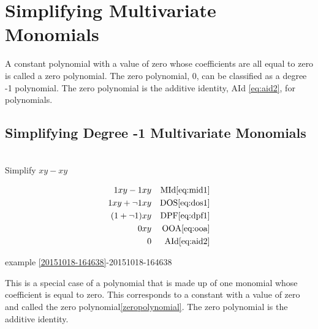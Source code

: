 \documentclass[20150903-160354-rs2.2-MarksMathNotebook.tex]{subfiles}
\begin{document}
%
%

\chapter{Simplifying Multivariate Monomials}


\begin{definition}\label{zeropolynomial}
A constant polynomial with a value of zero whose coefficients are all equal to zero is called a zero polynomial.  The zero polynomial, 0, can be classified as a degree -1 polynomial.  The zero polynomial is the additive identity, AId \eqref{eq:aid2}, for polynomials.

\hfill \cite{mathworld:zeropolynomial}
\end{definition}


\section{Simplifying Degree -1 Multivariate Monomials}\label{Simplify!Degree -1 Multivariate Monomials}

\begin{example}[id:20151018-165132] \label{20151018-165132} \hfill \\
Simplify $xy-xy$

\soln

\solnsteps
\begin{align*}
1xy-1xy && \text{MId} \eqref{eq:mid1} \\
1xy + \neg 1 xy && \text{DOS} \eqref{eq:dos1} \\
(1+\neg 1)xy && \text{DPF} \eqref{eq:dpf1} \\
0xy && \text{OOA} \eqref{eq:ooa} \\
0 && \text{AId} \eqref{eq:aid2} 
\end{align*}

\qdepend

\qdependlist
example \ref{20151018-164638}-20151018-164638

\end{example}

\begin{remark}
	This is a special case of a polynomial that is made up of one monomial whose coefficient is equal to zero.  This corresponds to a constant with a value of zero and called the zero polynomial\ref{zeropolynomial}.  The zero polynomial is the additive identity.
\end{remark}
\end{document}
